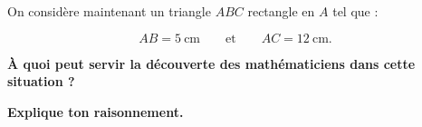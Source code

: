 \documentclass[10pt,a4paper,landscape]{article}
\begin{document}
\begin{minipage}[t]{0.48\textwidth}
\begin{tcolorbox}[
  enhanced,
  colback=ActionC!5,
  colframe=ActionC!60,
  boxrule=0.6pt,
  arc=2mm,
  left=3mm,
  right=3mm,
  top=2mm,
  bottom=2mm,
  before skip=1mm,
  after skip=0mm
]
\vspace{0.3em}

On considère maintenant un triangle \(ABC\) rectangle en \(A\)
tel que :

\[
AB=5\ \text{cm}
\qquad\text{et}\qquad
AC=12\ \text{cm}.
\]

\vspace{-0.3em}

\textbf{À quoi peut servir la découverte des mathématiciens
dans cette situation ?}

\smallskip

\textbf{Explique ton raisonnement.}

\end{tcolorbox}

\end{minipage}
\end{document}
